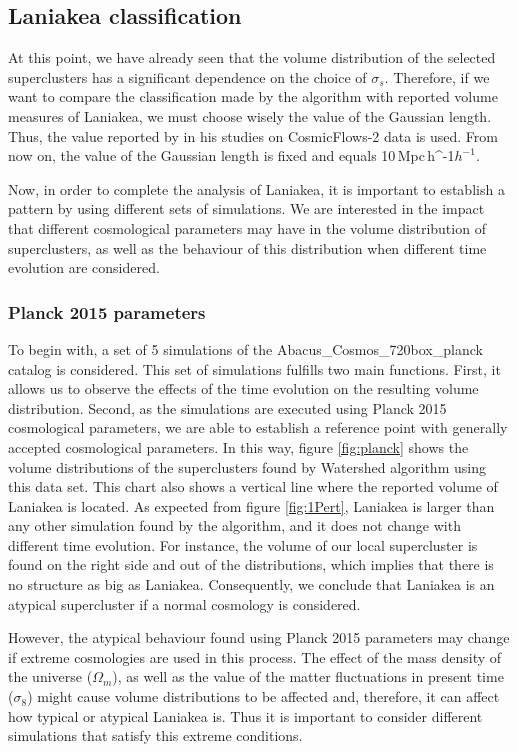\documentclass[usenatbib]{mnras}
\newcommand{\Mpch}{\,{\rm Mpc}\,\ifmmode h^{-1}\else $h^{-1}$\fi}
\begin{document}
\subsection{Laniakea classification}

At this point, we have already seen that the volume distribution of the selected superclusters has a significant dependence on the choice of $\sigma_s$. Therefore, if we want to compare the classification made by the algorithm with reported volume measures of Laniakea, we must choose wisely the value of the Gaussian length. Thus, the value reported by \cite{2014Natur.513...71T} in his studies on CosmicFlows-2 data is used. From now on, the value of the Gaussian length is fixed and equals 10\Mpch. 

Now, in order to complete the analysis of Laniakea, it is important to
establish a pattern by using different sets of simulations. We are
interested in the impact that different cosmological parameters may
have in the volume distribution of superclusters, as well as the
behaviour of this distribution when different time evolution are
considered. 


\subsubsection{Planck 2015 parameters}

To begin with, a set of 5 simulations of the
Abacus\_Cosmos\_720box\_planck catalog is considered. This set of
simulations fulfills two main functions. First, it allows us to
observe the effects of the time evolution on the resulting volume
distribution. Second, as the simulations are executed using Planck
2015 cosmological parameters, we are able to establish a reference
point with generally accepted cosmological parameters. In this way,
figure \ref{fig:planck} shows the volume distributions of the
superclusters found by Watershed algorithm using this data set. This
chart also shows a vertical line where the reported volume of Laniakea
is located. As expected from figure \ref{fig:1Pert}, Laniakea is
larger than any other simulation found by the algorithm, and it does
not change with different time evolution. For instance, the volume of
our local supercluster is found on the right side and out of the
distributions, which implies that there is no structure as big as
Laniakea. Consequently, we conclude that Laniakea is an atypical
supercluster if a normal cosmology is considered.  



However, the atypical behaviour found using Planck 2015 parameters may
change if extreme cosmologies are used in this process. The effect of
the mass density of the universe ($\Omega_m$), as well as the value of
the matter fluctuations in present time ($\sigma_8$) might cause
volume distributions to be affected and, therefore, it can affect how
typical or atypical Laniakea is. Thus it is important to consider
different simulations that satisfy this extreme conditions. 
\end{document}
